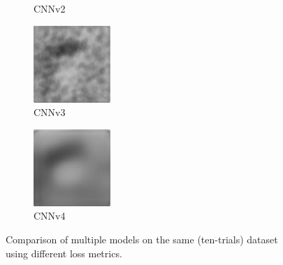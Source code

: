 \begin{figure}[H]
\begin{subfigure}[t]{0.15\textwidth}
    \caption{CNNv2}
  \end{subfigure}
  \begin{subfigure}[t]{0.15\textwidth}
    \includegraphics[width=\linewidth]{img/ten-trials/prediction_2_cnnv3.png}
    \caption{CNNv3}
  \end{subfigure}
  \begin{subfigure}[t]{0.15\textwidth}
    \includegraphics[width=\linewidth]{img/ten-trials/prediction_2_cnnv4.png}
    \caption{CNNv4}
  \end{subfigure}
  
\caption{Comparison of multiple models on the same (ten-trials) dataset using different loss metrics.}
\label{img:experiments:ten-trials:comparison-outputs}
\end{figure}

